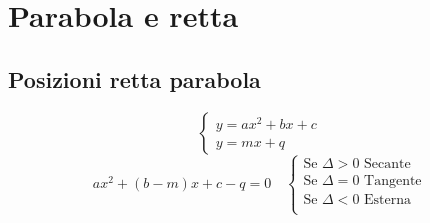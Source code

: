 \chapter{Parabola e retta}
\section{Posizioni retta parabola}
\begin{equation*}
\begin{cases}
y=ax^2+bx+c\\
y=mx+q
\end{cases}
\end{equation*}
\begin{equation*}
ax^2+(b-m)x+c-q=0\quad\begin{cases}
\text{Se $\Delta >0$ Secante}\\
\text{Se $\Delta =0$ Tangente}\\
\text{Se $\Delta <0$ Esterna}\\
\end{cases}
\end{equation*}
